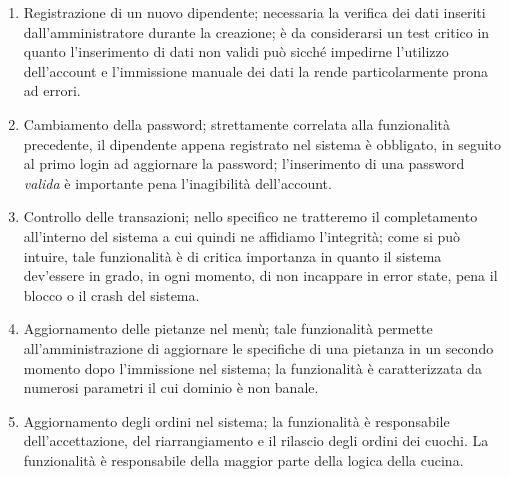 \begin{enumerate}
	\item Registrazione di un nuovo dipendente; necessaria la verifica dei dati inseriti 
	dall'amministratore durante la creazione; è da considerarsi un test critico in quanto
	l'inserimento di dati non validi può sicché impedirne l'utilizzo dell'account e 
	l'immissione manuale dei dati la rende particolarmente prona ad errori.

	\item Cambiamento della password; strettamente correlata alla funzionalità precedente,
	il dipendente appena registrato nel sistema è obbligato, in seguito al primo login
	ad aggiornare la password; l'inserimento di una password \textit{valida} è importante
	pena l'inagibilità dell'account.

	\item Controllo delle transazioni; nello specifico ne tratteremo il completamento
	all'interno del sistema a cui quindi ne affidiamo l'integrità; come si può intuire,
	tale funzionalità è di critica importanza in quanto il sistema dev'essere in grado,
	in ogni momento, di non incappare in error state, pena il blocco o il crash del sistema.

	\item Aggiornamento delle pietanze nel menù; tale funzionalità permette all'amministrazione
	di aggiornare le specifiche di una pietanza in un secondo momento dopo l'immissione
	nel sistema; la funzionalità è caratterizzata da numerosi parametri il cui dominio
	è non banale.

	\item Aggiornamento degli ordini nel sistema; la funzionalità è responsabile dell'accettazione,
	del riarrangiamento e il rilascio degli ordini dei cuochi. La funzionalità è responsabile
	della maggior parte della logica della cucina.
\end{enumerate}

\newpage\begingroup



